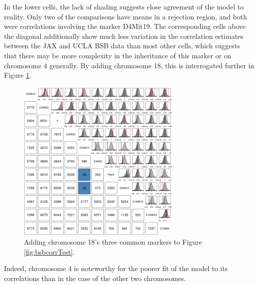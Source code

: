 \documentclass{article}
\newcommand{\ve}[1]{\mathbf{#1}}           %
\begin{document}
In the lower cells, the lack of shading suggests close agreement of the model to reality. Only two of the comparisons have means in a rejection region, and both were correlations involving the marker D4Mit19. The corresponding cells above the diagonal additionally show much less variation in the correlation estimates between the JAX and UCLA BSB data than most other cells, which suggests that there may be more complexity in the inheritance of this marker or on chromosome 4 generally. By adding chromosome 18, this is interrogated further in Figure \ref{fig:bsbcorrTestBig}.

\begin{figure}[htp]
  \begin{center}
      \includegraphics[width = 0.7\textwidth]{./img/bsbCorrTest2.png}
  \end{center}
  \caption{Adding chromosome 18's three common markers to Figure \ref{fig:bsbcorrTest}.}
  \label{fig:bsbcorrTestBig}
\end{figure}

Indeed, chromosome 4 is noteworthy for the poorer fit of the model to its correlations than in the case of the other two chromosomes.

\end{document}
